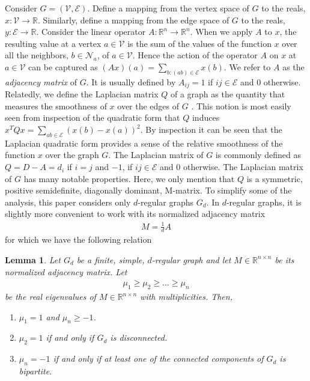 \documentclass[reqno,8pt]{amsart}
\newtheorem{lemma}{Lemma}
\theoremstyle{definition}
\theoremstyle{remark}
\numberwithin{equation}{section}
\def\R{\mathbb{R}}
\def\cV{\mathcal{V}}
\def\cE{\mathcal{E}}
\begin{document}
\medskip
Consider $G = (\mathcal{V},\mathcal{E})$. Define a mapping from the vertex space of $G$ to the reals, $x: \mathcal{V} \rightarrow \mathbb{R}$. Similarly, define a mapping from the edge space of $G$ to the reals, $y: \mathcal{E} \rightarrow \mathbb{R}$. Consider the linear operator $A:\mathbb{R}^n \rightarrow \mathbb{R}^n$. When we apply $A$ to $x$, the resulting value at a vertex $a \in \cV$ is the sum of the values of the function $x$ over all the neighbors, $b \in \mathcal{N}_a$, of $a \in \cV$.  Hence the action of the operator $A$ on $x$ at $a \in \cV$ can be captured as $(A x)(a) = \sum_{b:(ab) \in \mathcal{E}} x(b)$. We refer to $A$ as the \textit{adjacency matrix} of $G$. It is usually defined by $A_{ij}= 1$ if $ij\in \mathcal{E}$ and $0$ otherwise.
Relatedly, we define the Laplacian matrix $Q$ of a graph as the quantity that measures the smoothness of $x$ over the edges of $G$ \cite{Spielman2010,Lub1994}. This notion is most easily seen from inspection of the quadratic form that $Q$ induces $x^T Qx = \sum_{ab \in \cE} \left( x(b) - x(a) \right )^2$.
By inspection it can be seen that the Laplacian quadratic form provides a sense of the relative smoothness of the function $x$ over the graph $G$. The Laplacian matrix of $G$ is commonly defined as $Q = D - A = d_i$ if $i = j$ and $-1$, if $ij \in \cE$ and $0$ otherwise. The Laplacian matrix of $G$ has many notable properties.  Here, we only mention that $Q$ is a symmetric, positive semidefinite, diagonally dominant, M-matrix. To simplify some of the analysis, this paper considers only $d$-regular graphs $G_d$. In $d$-regular graphs, it is slightly more convenient to work with its normalized adjacency matrix
\begin{align}
M = \frac{1}{d}A
\end{align}
for which we have the following relation
\begin{lemma} \label{lem:eigA}
Let $G_d$ be a finite, simple, $d$-regular graph and let $M \in \R^{n \times n}$ be its normalized adjacency matrix. Let 
\begin{align*}
\mu_1 \geq \mu_2 \geq \ldots \geq \mu_n
\end{align*}
be the real eigenvalues of $M \in \R^{n \times n}$ with multiplicities. Then, 
\begin{enumerate}
\item $\mu_1 = 1$ and $\mu_n \geq -1$.
\item $\mu_2 = 1$ if and only if $G_d$ is disconnected.
\item $\mu_n = -1$ if and only if at least one of the connected components of $G_d$ is bipartite.
\end{enumerate}
\end{lemma}
\end{document}
